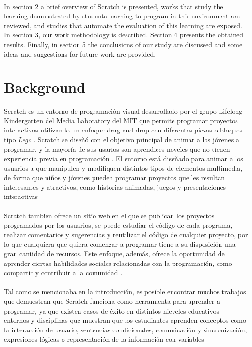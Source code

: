 \documentclass[a4paper,10pt]{article}
\begin{document}
\paragraph{}In section 2 a brief overview of Scratch is presented, works that study the learning demonstrated by students learning to program in this environment are reviewed, and studies that automate the evaluation of this learning are exposed. In section 3, our work methodology is described. Section 4 presents the obtained results. Finally, in section 5 the conclusions of our study are discussed and some ideas and suggestions for future work are provided.

\section{Background}

\paragraph{}Scratch es un entorno de programación visual desarrollado por el grupo Lifelong Kindergarten del Media Laboratory del MIT que permite programar proyectos interactivos utilizando un enfoque drag-and-drop con diferentes piezas o bloques tipo \textit{Lego} \cite{resnick2009scratch}. Scratch se diseñó con el objetivo principal de animar a los jóvenes a programar, y la mayoría de sus usarios son aprendices noveles que no tienen experiencia previa en programación \cite{maloney2010scratch}. El entorno está diseñado para animar a los usuarios a que manipulen y modifiquen distintos tipos de elementos multimedia, de forma que niños y jóvenes pueden programar proyectos que les resultan interesantes y atractivos, como historias animadas, juegos y presentaciones interactivas \cite{maloney2008programming}
\paragraph{}Scratch también ofrece un sitio web en el que se publican los proyectos programados por los usuarios, se puede estudiar el código de cada programa, realizar comentarios y sugerencias y reutilizar el código de cualquier proyecto, por lo que cualquiera que quiera comenzar a programar tiene a su disposición una gran cantidad de recursos. Este enfoque, además, ofrece la oportunidad de aprender ciertas habilidades sociales relacionadas con la programación, como compartir y contribuir a la comunidad \cite{scaffidi2012skill}.
\paragraph{}Tal como se mencionaba en la introducción, es posible encontrar muchos trabajos \cite{maloney2008programming, franklin2013assessment,scaffidi2012skill,malan2007scratch} que demuestran que Scratch funciona como herramienta para aprender a programar, ya que existen casos de éxito en distintos nieveles educativos, entornos y disciplinas que muestran que los estudiantes aprenden conceptos como la interacción de usuario, sentencias condicionales, comunicación y sincronización, expresiones lógicas o representación de la información con variables.
\end{document}
